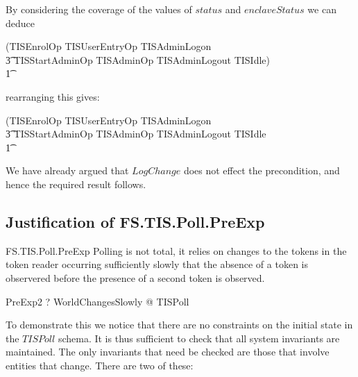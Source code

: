 By considering the coverage of the values of $status$ and
$enclaveStatus$ we can deduce
\begin{argue}
 \pre (TISEnrolOp \lor TISUserEntryOp \lor TISAdminLogon 
\\ \t3                  \lor TISStartAdminOp \lor  TISAdminOp \lor
TISAdminLogout \lor TISIdle) 
\\ \t1  \equiv [~ IDStation; RealWorld | 
\\      \t4 (status = quiescent \land enclaveStatus = enclaveQuiescent ) 
\\      \t4 \lor (status \neq quiescent) 
\\      \t4 \lor (enclaveStatus \neq enclaveQuiescent \land enclaveStatus \neq
shutdown) ~]
\end{argue}
rearranging this gives:
\begin{argue}
 \pre (TISEnrolOp \lor TISUserEntryOp \lor TISAdminLogon 
\\ \t3                  \lor TISStartAdminOp \lor  TISAdminOp \lor
TISAdminLogout \lor TISIdle 
\\ \t1 
\end{argue}

We have already argued that $LogChange$ does not effect the
precondition, and hence the required result follows.

\subsection{Justification of FS.TIS.Poll.PreExp}

\begin{Zpobtrace}{FS.TIS.Poll.PreExp}
Polling is not total, it relies on changes to the tokens in the token
reader occurring sufficiently slowly that the absence of a token is
observered before the presence of a second token is observed.
\begin{theorem}{PreExp2} \vdash? 
\forall WorldChangesSlowly @ \pre TISPoll
\end{theorem}
\end{Zpobtrace}

To demonstrate this we notice that there are no constraints on the initial
state in the $TISPoll$ schema. 
It is thus sufficient to check that all system invariants are
maintained. 
The only invariants that need be checked are those that
involve entities that change. There are two of these:

